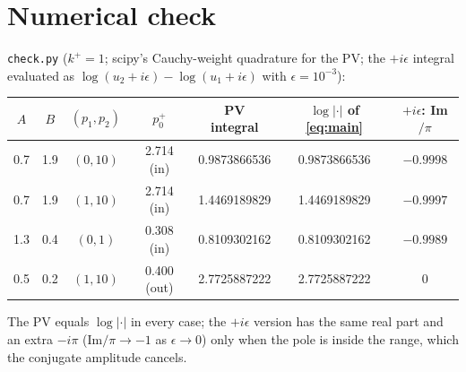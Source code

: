 \documentclass[11pt]{article}
\numberwithin{equation}{section}
\begin{document}
\section{Numerical check}
\texttt{check.py} ($k^+=1$; scipy's Cauchy-weight quadrature for the PV; the $+i\epsilon$ integral evaluated as $\log(u_2+i\epsilon)-\log(u_1+i\epsilon)$ with $\epsilon=10^{-3}$):
\begin{center}
\begin{tabular}{@{}cccc c c c@{}}
\toprule
$A$ & $B$ & $(p_1,p_2)$ & $p_0^+$ & PV integral & $\log|\cdot|$ of \eqref{eq:main} & $+i\epsilon$: Im$/\pi$\\\midrule
0.7 & 1.9 & $(0,10)$ & 2.714 (in) & 0.9873866536 & 0.9873866536 & $-0.9998$\\
0.7 & 1.9 & $(1,10)$ & 2.714 (in) & 1.4469189829 & 1.4469189829 & $-0.9997$\\
1.3 & 0.4 & $(0,1)$ & 0.308 (in) & 0.8109302162 & 0.8109302162 & $-0.9989$\\
0.5 & 0.2 & $(1,10)$ & 0.400 (out) & 2.7725887222 & 2.7725887222 & $0$\\
\bottomrule
\end{tabular}
\end{center}
The PV equals $\log|\cdot|$ in every case; the $+i\epsilon$ version has the same real part and an extra $-i\pi$ (Im$/\pi\to-1$ as $\epsilon\to0$) only when the pole is inside the range, which the conjugate amplitude cancels.
\end{document}

